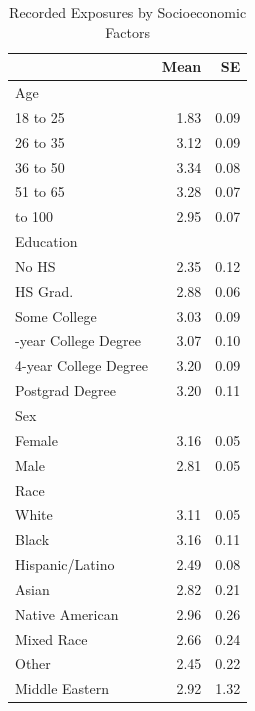 \begin{table}

\caption{\label{tab:socdem_dat}Recorded Exposures by Socioeconomic Factors}
\centering
\begin{tabular}[t]{lrr}
\toprule
 & Mean & SE\\
\midrule
Age &  & \\
18 to 25 & 1.83 & 0.09\\
26 to 35 & 3.12 & 0.09\\
36 to 50 & 3.34 & 0.08\\
51 to 65 & 3.28 & 0.07\\
\addlinespace
66 to 100 & 2.95 & 0.07\\
Education &  & \\
No HS & 2.35 & 0.12\\
HS Grad. & 2.88 & 0.06\\
Some College & 3.03 & 0.09\\
\addlinespace
2-year College Degree & 3.07 & 0.10\\
4-year College Degree & 3.20 & 0.09\\
Postgrad Degree & 3.20 & 0.11\\
Sex &  & \\
Female & 3.16 & 0.05\\
\addlinespace
Male & 2.81 & 0.05\\
Race &  & \\
White & 3.11 & 0.05\\
Black & 3.16 & 0.11\\
Hispanic/Latino & 2.49 & 0.08\\
\addlinespace
Asian & 2.82 & 0.21\\
Native American & 2.96 & 0.26\\
Mixed Race & 2.66 & 0.24\\
Other & 2.45 & 0.22\\
Middle Eastern & 2.92 & 1.32\\
\bottomrule
\end{tabular}
\end{table}
